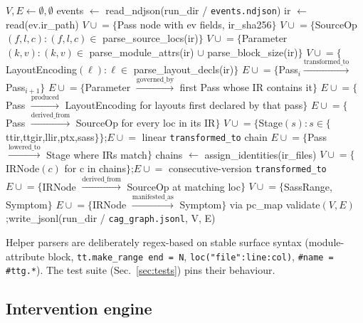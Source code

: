 \documentclass[10pt]{article}
\begin{document}
\begin{algorithm}[h]
\caption{Linker: \texttt{build\_graph(run\_dir)}}
\begin{algorithmic}[1]
  \State $V, E \gets \emptyset, \emptyset$
  \State events $\gets$ read\_ndjson(run\_dir / \texttt{events.ndjson})
    \State ir $\gets$ read(ev.ir\_path)
    \State $V \cup\!= \{$Pass node with ev fields, ir\_sha256$\}$
    \State $V \cup\!= \{$SourceOp$(f,l,c) : (f,l,c) \in$ parse\_source\_locs(ir)$\}$
    \State $V \cup\!= \{$Parameter$(k,v) : (k,v) \in$ parse\_module\_attrs(ir) $\cup$ parse\_block\_size(ir)$\}$
    \State $V \cup\!= \{$LayoutEncoding$(\ell) : \ell \in$ parse\_layout\_decls(ir)$\}$
  \EndFor
  \State $E \cup\!= \{$Pass$_i \xrightarrow{\text{transformed\_to}}$ Pass$_{i+1}\}$
  \State $E \cup\!= \{$Parameter $\xrightarrow{\text{governed\_by}}$ first Pass whose IR contains it$\}$
  \State $E \cup\!= \{$Pass $\xrightarrow{\text{produced}}$ LayoutEncoding for layouts first declared by that pass$\}$
  \State $E \cup\!= \{$Pass $\xrightarrow{\text{derived\_from}}$ SourceOp for every loc in its IR$\}$
  \State $V \cup\!= \{$Stage$(s) : s \in \{$ttir,ttgir,llir,ptx,sass$\}\}$;\quad $E \cup\!= $ linear \texttt{transformed\_to} chain
  \State $E \cup\!= \{$Pass $\xrightarrow{\text{lowered\_to}}$ Stage where IRs match$\}$
  \State chains $\gets$ assign\_identities(ir\_files) 
  \State $V \cup\!= \{$IRNode$(c)$ for c in chains$\}$;\quad $E \cup\!= $ consecutive-version \texttt{transformed\_to}
  \State $E \cup\!= \{$IRNode $\xrightarrow{\text{derived\_from}}$ SourceOp at matching loc$\}$
    \State $V \cup\!= \{$SassRange, Symptom$\}$
    \State $E \cup\!= \{$IRNode $\xrightarrow{\text{manifested\_as}}$ Symptom$\}$ via pc\_map
  \EndIf
  \State validate$(V, E)$;\quad write\_jsonl(run\_dir / \texttt{cag\_graph.jsonl}, V, E)
\end{algorithmic}
\end{algorithm}

Helper parsers are deliberately regex-based on stable surface syntax (module-attribute block, \texttt{tt.make\_range end = N}, \texttt{loc("file":line:col)}, \texttt{\#name = \#ttg.*}). The test suite (Sec.~\ref{sec:tests}) pins their behaviour.

\subsection{Intervention engine}\label{sec:intervention}
\end{document}
